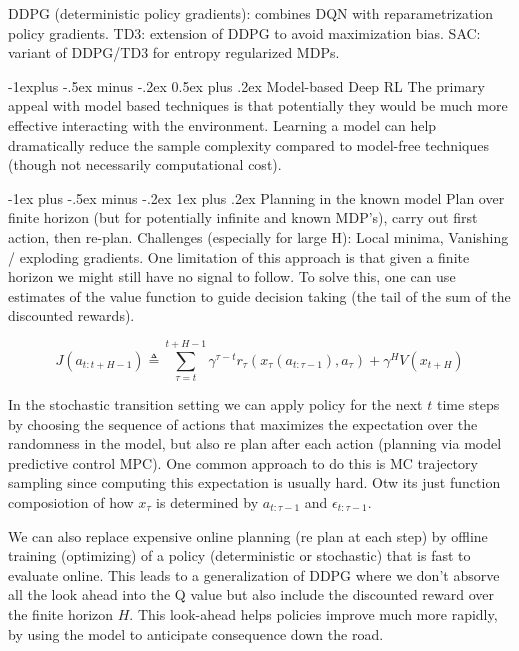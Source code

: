 \documentclass[a4paper, 11pt, twoside, landscape]{article}
\makeatletter
\renewcommand{\subsection}{\@startsection{subsection}{2}{0mm}%
                                {-1explus -.5ex minus -.2ex}%
                                {0.5ex plus .2ex}%
                                {\normalfont\normalsize\bfseries}}
\renewcommand{\subsubsection}{\@startsection{subsubsection}{3}{0mm}%
                                {-1ex plus -.5ex minus -.2ex}%
                                {1ex plus .2ex}%
                                {\normalfont\small\bfseries}}
\makeatother
\begin{document}
\begin{multicols}{4}
DDPG (deterministic policy gradients): combines DQN with reparametrization policy gradients. TD3: extension of DDPG to avoid maximization bias. SAC: variant of DDPG/TD3 for entropy regularized MDPs.

\subsection{Model-based Deep RL}
The primary appeal with model based techniques is that potentially they would be much more effective interacting with the environment. Learning a model can help dramatically reduce the sample complexity compared to model-free techniques (though not necessarily computational cost).

\subsubsection{Planning in the known model}
Plan over finite horizon (but for potentially infinite and known MDP's), carry out first action, then re-plan. Challenges (especially for large H): Local minima, Vanishing / exploding gradients. One limitation of this approach is that given a finite horizon we might still have no signal to follow. To solve this, one can use estimates of the value function to guide decision taking (the tail of the sum of the discounted rewards). 

$$
J(a_{t:t+H-1}) \triangleq \sum_{\tau = t}^{t+H-1} \gamma^{\tau - t}r_{\tau}(x_{\tau}(a_{t:\tau-1}), a_{\tau}) + \gamma^H V(x_{t+H})
$$

In the stochastic transition setting we can apply policy for the next $t$ time steps by choosing the sequence of actions that maximizes the expectation over the randomness in the model, but also re plan after each action (planning via model predictive control MPC). One common approach to do this is MC trajectory sampling since computing this expectation is usually hard. Otw its just function composiotion of how $x_{\tau}$ is determined by $a_{t:\tau-1}$ and $\epsilon_{t:\tau-1}$.

We can also replace expensive online planning (re plan at each step) by offline training (optimizing) of a policy (deterministic or stochastic) that is fast to evaluate online. This leads to a generalization of DDPG where we don't absorve all the look ahead into the Q value but also include the discounted reward over the finite horizon $H$. This look-ahead helps policies improve much more rapidly, by using the model to anticipate consequence down the road. 


\end{multicols}
\end{document}
